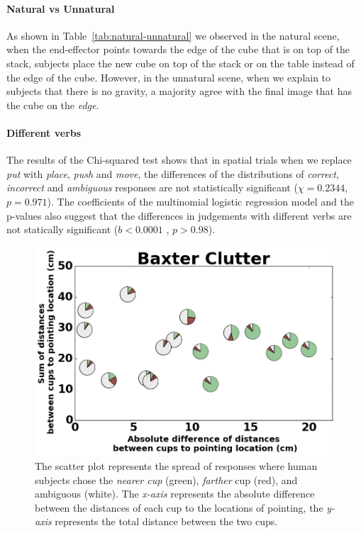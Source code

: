 \paragraph{Natural vs Unnatural}

As shown in Table~\ref{tab:natural-unnatural} we observed in the natural scene, when the end-effector points towards the edge of the cube that is on top of the stack, subjects place the new cube on top of the stack or on the table instead of the edge of the cube. However, in the unnatural scene, when we explain to subjects that there is no gravity, a majority agree with the final image that has the cube on the \textit{edge}.






\paragraph{Different verbs}
The results of the Chi-squared test shows that in spatial trials when we replace \textit{put} with \textit{place}, \textit{push} and \textit{move}, the differences of the distributions of \textit{correct}, \textit{incorrect} and \textit{ambiguous} responses are not statistically significant ($\chi=0.2344 $, $p = 0.971$). The coefficients of the multinomial logistic regression model and the p-values also suggest that the differences in judgements 
with different verbs are not statically significant ($b<0.0001$ , $p>0.98$).


\begin{figure}[h!]
    \centering
    \includegraphics[width=\linewidth]{figures/baxter_Clutter_granular.png}
    \caption{The scatter plot represents the spread of responses where human subjects chose the \textit{nearer cup} (green), \textit{farther} cup (red), and ambiguous (white). The \textit{x-axis} represents the absolute difference between the distances of each cup to the locations of pointing, the \textit{y-axis} represents the total distance between the two cups.}
    \label{fig:cluttered}
\end{figure}
